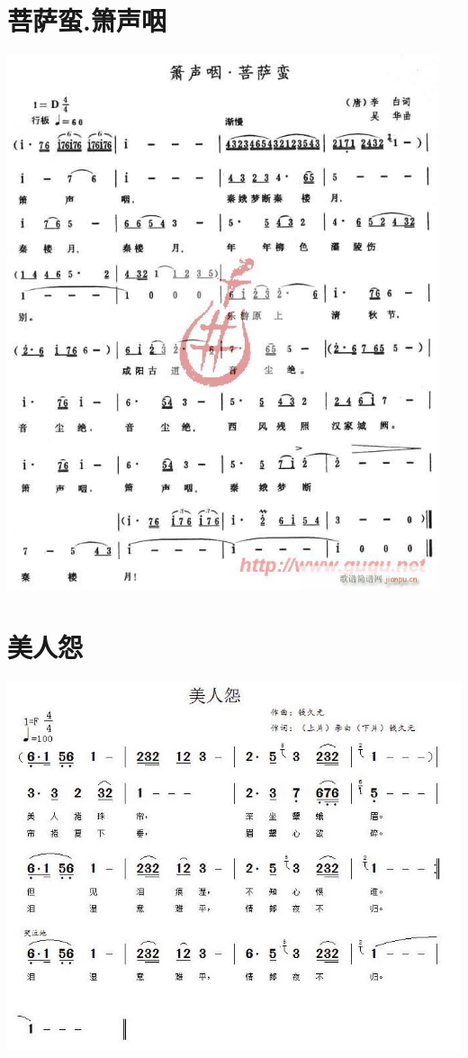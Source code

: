 \documentclass[cn,pad,chinesefont=nofont,twocol]{elegantbook}
\begin{document}
\section{菩萨蛮.箫声咽}
    \includegraphics[width=0.95\textwidth]{dongxiao/20200909-箫声咽-菩萨蛮.jpg}
\section{美人怨}
    \includegraphics[width=\textwidth]{dongxiao/20200808-美人怨-李白.jpg}
\end{document}
